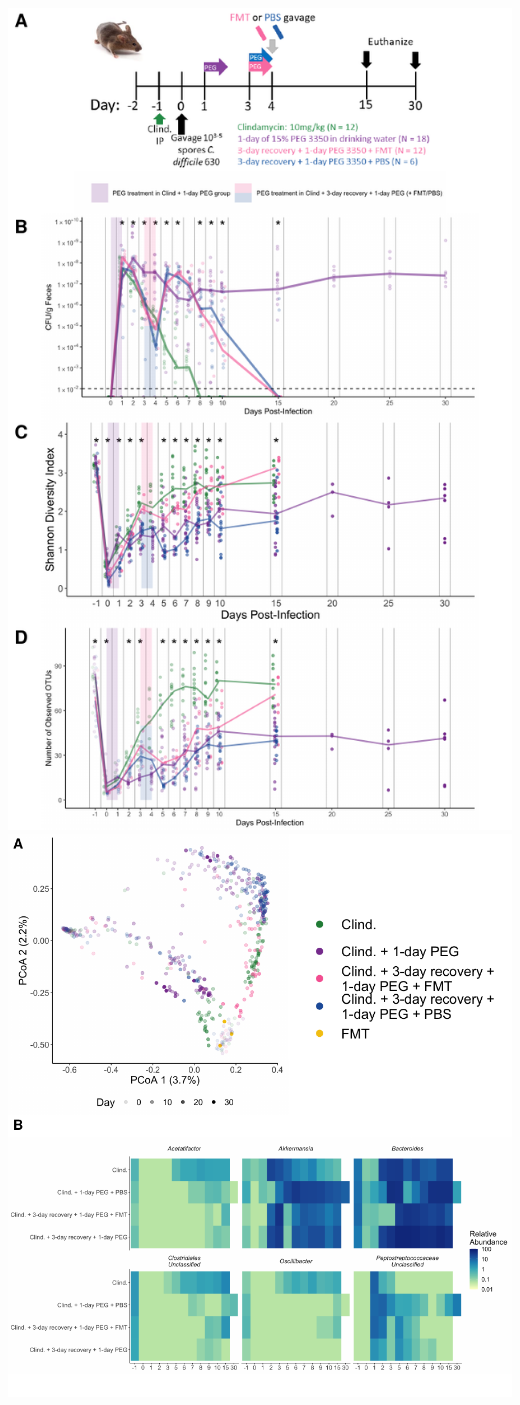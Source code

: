 \documentclass[
  11pt,
]{article}
\begin{document}
\includegraphics{figure_5.pdf} \includegraphics{figure_5_16S.pdf}
\end{document}
